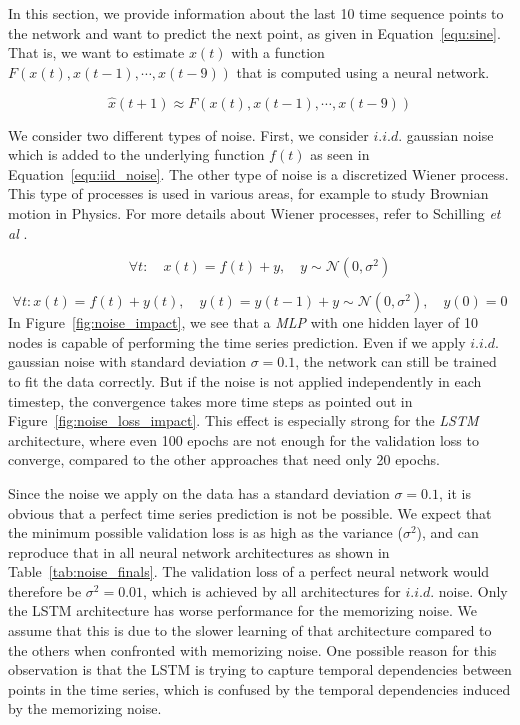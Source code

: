 \documentclass{article}
\begin{document}
In this section, we provide information about the last 10 time sequence points
to the network and want to predict the next point, as given in
Equation~\ref{equ:sine}. That is, we want to estimate $x(t)$ with a function
$F(x(t), x(t-1), \cdots, x(t-9))$ that is computed using a neural network.

\begin{equation}
  \hat{x} (t + 1) \approx F(x(t), x(t-1), \cdots, x(t-9))
  \label{equ:sine}
\end{equation}

We consider two different types of noise. First, we consider $i.i.d.$ gaussian
noise which is added to the underlying function $f(t)$
as seen in Equation~\ref{equ:iid_noise}. The other type of noise is a
discretized Wiener process. This type of processes is used in various areas,
for example to study Brownian motion in Physics.
For more details about Wiener processes, refer to Schilling
\textit{et al} \cite{schilling2014}.

\begin{equation}
  \forall t: \quad x(t) = f(t) + y, \quad y \sim \mathcal{N}(0, \sigma^2)
  \label{equ:iid_noise}
\end{equation}

\begin{equation}
  \forall t: x(t) = f(t) + y(t), \quad y(t) = y(t-1) + y \sim \mathcal{N}(0, \sigma^2), \quad y(0) = 0
  \label{equ:wiener}
\end{equation}
In Figure~\ref{fig:noise_impact}, we see that a \emph{MLP}
with one hidden layer of 10 nodes is capable of performing the time series
prediction. Even if we apply $i.i.d.$ gaussian noise with standard
deviation $\sigma = 0.1$, the
network can still be trained to fit the data correctly. But if the noise is not
applied independently in each timestep, the convergence takes more time steps as
pointed out in Figure~\ref{fig:noise_loss_impact}. This effect is especially
strong for the \emph{LSTM} architecture, where even 100 epochs are not enough
for the validation loss to converge, compared to the other approaches that need
only 20 epochs.

Since the noise we apply on the data has a standard deviation $\sigma = 0.1$,
it is obvious that a perfect time series prediction is not be possible. We
expect that the minimum possible validation loss is as high as the variance
($\sigma^2$), and can reproduce that in all neural network architectures as
shown in Table~\ref{tab:noise_finals}. The validation loss of a perfect
neural network would therefore be $\sigma^2 = 0.01$, which is achieved by all
architectures for $i.i.d.$ noise. Only the LSTM architecture has worse
performance for the memorizing noise. We assume that this is due to the slower
learning of that architecture compared to the others when confronted with
memorizing noise. One possible reason for this observation is that the LSTM is
trying to capture temporal dependencies between points in the time series, which
is confused by the temporal dependencies induced by the memorizing noise.
\end{document}
